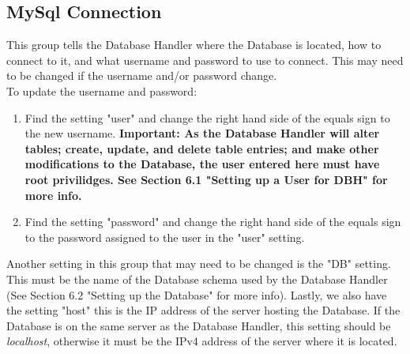 \documentclass[letterpaper]{article}
\begin{document}
	\subsection{MySql Connection}
	This group tells the Database Handler where the Database is located, how to connect to it, and what username and password to use to connect. This may need to be changed if the username and/or password change. \\To update the username and password:
	\begin{enumerate}
		\item Find the setting "user" and change the right hand side of the equals sign to the new username. \textbf{Important: As the Database Handler will alter tables; create, update, and delete table entries; and make other modifications to the Database, the user entered here must have root privilidges. See Section 6.1 "Setting up a User for DBH" for more info.}
		\item Find the setting "password" and change the right hand side of the equals sign to the password assigned to the user in the "user" setting.
	\end{enumerate}
	Another setting in this group that may need to be changed is the "DB" setting. This must be the name of the Database schema used by the Database Handler (See Section 6.2 "Setting up the Database" for more info).
	Lastly, we also have the setting "host" this is the IP address of the server hosting the Database. If the Database is on the same server as the Database Handler, this setting should be \textit{localhost}, otherwise it must be the IPv4 address of the server where it is located.
	
\end{document}
